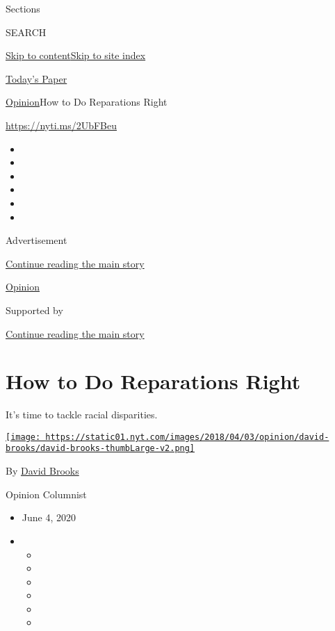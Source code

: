 Sections

SEARCH

\protect\hyperlink{site-content}{Skip to
content}\protect\hyperlink{site-index}{Skip to site index}

\href{https://myaccount.nytimes.com/auth/login?response_type=cookie\&client_id=vi}{}

\href{https://www.nytimes.com/section/todayspaper}{Today's Paper}

\href{/section/opinion}{Opinion}\textbar{}How to Do Reparations Right

\href{https://nyti.ms/2UbFBeu}{https://nyti.ms/2UbFBeu}

\begin{itemize}
\item
\item
\item
\item
\item
\item
\end{itemize}

Advertisement

\protect\hyperlink{after-top}{Continue reading the main story}

\href{/section/opinion}{Opinion}

Supported by

\protect\hyperlink{after-sponsor}{Continue reading the main story}

\hypertarget{how-to-do-reparations-right}{%
\section{How to Do Reparations
Right}\label{how-to-do-reparations-right}}

It's time to tackle racial disparities.

\href{https://www.nytimes.com/by/david-brooks}{\texttt{[image: https://static01.nyt.com/images/2018/04/03/opinion/david-brooks/david-brooks-thumbLarge-v2.png]}}

By \href{https://www.nytimes.com/by/david-brooks}{David Brooks}

Opinion Columnist

\begin{itemize}
\item
  June 4, 2020
\item
  \begin{itemize}
  \item
  \item
  \item
  \item
  \item
  \item
  \end{itemize}
\end{itemize}

